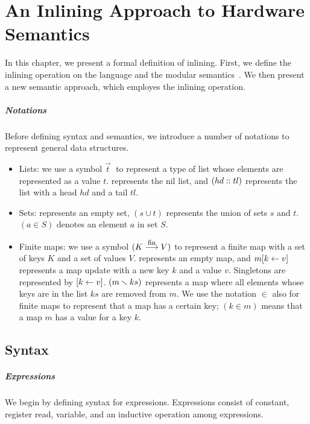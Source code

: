\chapter{An Inlining Approach to Hardware Semantics}
\label{chap:semantics}

In this chapter, we present a formal definition of inlining.  First,
we define the inlining operation on the \Kami{} language and the
modular semantics~\cite{murali-thesis}. We then present a new semantic
approach, which employes the inlining operation.

\paragraph{Notations}

Before defining syntax and semantics, we introduce a number of
notations to represent general data structures.
\begin{itemize}
\item Lists: we use a symbol $\vec{t}\;$ to represent a type of list
  whose elements are represented as a value $t$. \listnil{} represents
  the nil list, and $(hd::tl)$ represents the list with a
  head $hd$ and a tail $tl$.
\item Sets: \emptyset{} represents an empty set, $(s \cup t)$
  represents the union of sets $s$ and $t$. $(a \in S)$ denotes an
  element $a$ in set $S$.
\item Finite maps: we use a symbol $(K \stackrel{\textrm{\footnotesize{fin}}}{\longrightarrow} V)$ to represent a
  finite map with a set of keys $K$ and a set of values
  $V$. \emptymap{} represents an empty map, and $m [ k \leftarrow v ]$
  represents a map update with a new key $k$ and a value
  $v$. Singletons are represented by
  $ [ k \leftarrow v ]$. $(m \smallsetminus{} ks)$ represents a map where all
  elements whose keys are in the list $ks$ are removed from $m$. We
  use the notation $\in$ also for finite maps to represent that a map
  has a certain key; $(k \in m)$ means that a map $m$ has a value for
  a key $k$.
\end{itemize}

\section{Syntax}

\paragraph{Expressions}
We begin by defining syntax for expressions. Expressions consist of
constant, register read, variable, and an inductive operation among
expressions.

